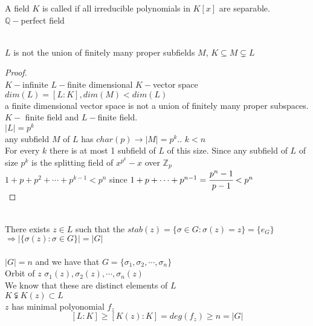 \documentclass{article}
\begin{document}
    A field $K$ is called  if all irreducible polynomials in $K[x]$ are separable. \\
    $\mathbb{Q}-$perfect field
\begin{lemma} \leavevmode \\ 
    $L$ is not  the union of finitely many proper subfields $M$, $K \subseteq M \subsetneq L$ 
    
\end{lemma}
\begin{proof}
    \leavevmode \\ 
    $K-$infinite $L-$finite dimensional $K-$vector space $dim(L) = [L:K], dim(M) < dim(L)$\\ a finite dimensional vector space is not a union of finitely many proper subspaces.  \\ 
    $K-$ finite field and $L-$finite field. \\ 
    $|L| = p^k$ \\ 
    any subfield $M$ of $L$ has $char(p) \rightarrow |M| = p^k$.. $k< n$ \\ 
    For every $k$ there is at most 1 subfield of $L$ of this size. 
    Since any subfield of $L$ of size $p^k$ is the splitting field of $x^{p^k} - x$ over $\mathbb{Z}_p$\\
    $1+ p+p^2 + \cdots + p^{k-1} <  p^n$ since $1 + p + \cdots + p^{n -1} = \cfrac{p^n - 1}{p-1} < p^n$ \\
\end{proof}
\begin{corollary} \leavevmode \\ 
    There exists $z \in L$ such that the $stab(z) = \{\sigma \in G: \sigma(z) = z\} = \{e_G\}$\\ 
    $\Rightarrow |\{\sigma(z): \sigma \in G\} | = |G|$
    \\  \\ 
    $|G| = n$ and we have that $G = \{\sigma_1, \sigma_2, \cdots, \sigma_n\}$ \\ Orbit of $z$ $\sigma_1(z), \sigma_2(z), \cdots, \sigma_n(z)$ \\ 
    We know that these are distinct elements of $L$ \\
    
    $K \subsetneqq K(z) \subset L$ \\ 
    $z$ has minimal polyonomial $f_z$\\ 
    $$[L:K] \geq [K(z) :K] = deg(f_z) \geq n = |G|$$
\end{corollary}
\end{document}
